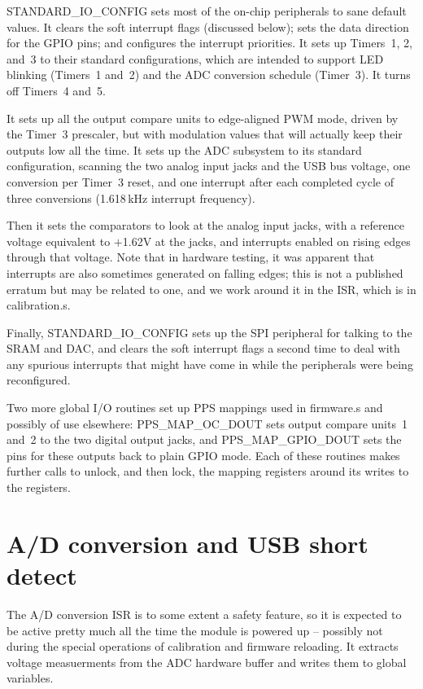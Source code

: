 STANDARD\_IO\_CONFIG sets most of the on-chip peripherals to sane default
values.  It clears the soft interrupt flags (discussed below); sets the data
direction for the GPIO pins; and configures the interrupt priorities.  It
sets up Timers~1, 2, and~3 to their standard configurations, which are
intended to support LED blinking (Timers~1 and~2) and the ADC conversion
schedule (Timer~3).  It turns off Timers~4 and~5.

It sets up all the output
compare units to edge-aligned PWM mode, driven by the Timer~3 prescaler, but
with modulation values that will actually keep their outputs low all the
time.  It sets up the ADC subsystem to its standard configuration, scanning
the two analog input jacks and the USB bus voltage, one conversion per
Timer~3 reset, and one interrupt after each completed cycle of three
conversions (1.618\,kHz interrupt frequency).

Then it sets the comparators to look at the analog input jacks, with a
reference voltage equivalent to $+$1.62V at the jacks, and interrupts enabled
on rising edges through that voltage.  Note that in hardware testing, it was
apparent that interrupts are also sometimes generated on falling edges; this
is not a published erratum but may be related to one, and we work around it
in the ISR, which is in calibration.s.

Finally, STANDARD\_IO\_CONFIG sets up the SPI peripheral for talking to the
SRAM and DAC, and clears the soft interrupt flags a second time to deal
with any spurious interrupts that might have come in while the peripherals
were being reconfigured.

Two more global I/O routines set up PPS mappings used in firmware.s and
possibly of use elsewhere:  PPS\_MAP\_OC\_DOUT sets output compare units~1
and~2 to the two digital output jacks, and PPS\_MAP\_GPIO\_DOUT sets the
pins for these outputs back to plain GPIO mode.  Each of these routines
makes further calls to unlock, and then lock, the mapping registers around
its writes to the registers.

\section{A/D conversion and USB short detect}

The A/D conversion ISR is to some extent a safety feature, so it is expected
to be active pretty much all the time the module is powered up -- possibly
not during the special operations of calibration and firmware reloading.  It
extracts voltage measuerments from the ADC hardware buffer and writes them
to global variables.

